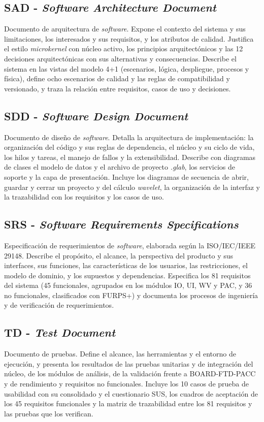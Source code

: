 \documentclass[12pt,letterpaper,oneside]{article}
\begin{document}
\subsection{SAD - \textit{Software Architecture Document}}
\label{anx:sad}
Documento de arquitectura de \textit{software}. Expone el contexto del sistema y sus limitaciones, los interesados y sus requisitos, y los atributos de calidad. Justifica el estilo \textit{microkernel} con núcleo activo, los principios arquitectónicos y las 12 decisiones arquitectónicas con sus alternativas y consecuencias. Describe el sistema en las vistas del modelo 4+1 (escenarios, lógica, despliegue, procesos y física), define ocho escenarios de calidad y las reglas de compatibilidad y versionado, y traza la relación entre requisitos, casos de uso y decisiones.

\subsection{SDD - \textit{Software Design Document}}
\label{anx:sdd}
Documento de diseño de \textit{software}. Detalla la arquitectura de implementación: la organización del código y sus reglas de dependencia, el núcleo y su ciclo de vida, los hilos y tareas, el manejo de fallos y la extensibilidad. Describe con diagramas de clases el modelo de datos y el archivo de proyecto \textit{.glab}, los servicios de soporte y la capa de presentación. Incluye los diagramas de secuencia de abrir, guardar y cerrar un proyecto y del cálculo \textit{wavelet}, la organización de la interfaz y la trazabilidad con los requisitos y los casos de uso.

\subsection{SRS - \textit{Software Requirements Specifications}}
\label{anx:srs}
Especificación de requerimientos de \textit{software}, elaborada según la ISO/IEC/IEEE 29148. Describe el propósito, el alcance, la perspectiva del producto y sus interfaces, sus funciones, las características de los usuarios, las restricciones, el modelo de dominio, y los supuestos y dependencias. Especifica los 81 requisitos del sistema (45 funcionales, agrupados en los módulos IO, UI, WV y PAC, y 36 no funcionales, clasificados con FURPS+) y documenta los procesos de ingeniería y de verificación de requerimientos.

\subsection{TD - \textit{Test Document}}
\label{anx:td}
Documento de pruebas. Define el alcance, las herramientas y el entorno de ejecución, y presenta los resultados de las pruebas unitarias y de integración del núcleo, de los módulos de análisis, de la validación frente a BOARD-FTD-PACC y de rendimiento y requisitos no funcionales. Incluye los 10 casos de prueba de usabilidad con su consolidado y el cuestionario SUS, los cuadros de aceptación de los 45 requisitos funcionales y la matriz de trazabilidad entre los 81 requisitos y las pruebas que los verifican.
\end{document}
